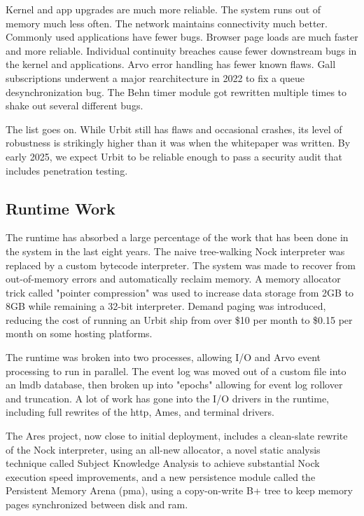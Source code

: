 \documentclass[twoside]{article}
\begin{document}
Kernel and app upgrades are much more reliable.  The system runs out of memory much less often.  The network maintains connectivity much better.  Commonly used applications have fewer bugs.  Browser page loads are much faster and more reliable.  Individual continuity breaches cause fewer downstream bugs in the kernel and applications.  Arvo error handling has fewer known flaws.  Gall subscriptions underwent a major rearchitecture in 2022 to fix a queue desynchronization bug.  The Behn timer module got rewritten multiple times to shake out several different bugs.

The list goes on.  While Urbit still has flaws and occasional crashes, its level of robustness is strikingly higher than it was when the whitepaper was written.  By early 2025, we expect Urbit to be reliable enough to pass a security audit that includes penetration testing.

\subsection{Runtime Work}

The runtime has absorbed a large percentage of the work that has been done in the system in the last eight years.  The naive tree-walking Nock interpreter was replaced by a custom bytecode interpreter.  The system was made to recover from out-of-memory errors and automatically reclaim memory.  A memory allocator trick called "pointer compression" was used to increase data storage from 2GB to 8GB while remaining a 32-bit interpreter.  Demand paging was introduced, reducing the cost of running an Urbit ship from over \$10 per month to \$0.15 per month on some hosting platforms.

The runtime was broken into two processes, allowing I/O and Arvo event processing to run in parallel.  The event log was moved out of a custom file into an {\sc lmdb} database, then broken up into "epochs" allowing for event log rollover and truncation.  A lot of work has gone into the I/O drivers in the runtime, including full rewrites of the {\sc http}, Ames, and terminal drivers.  

The Ares project, now close to initial deployment, includes a clean-slate rewrite of the Nock interpreter, using an all-new allocator, a novel static analysis technique called Subject Knowledge Analysis to achieve substantial Nock execution speed improvements, and a new persistence module called the Persistent Memory Arena ({\sc pma}), using a copy-on-write B+ tree to keep memory pages synchronized between disk and {\sc ram}.
\end{document}
